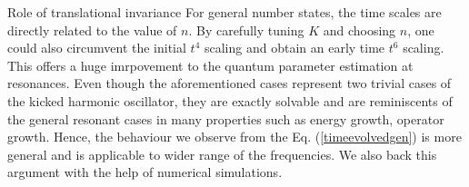 \documentclass[amsmath,nobibnotes,aps,amssymb,pra, prl,aps,showpacs,superscriptaddress,twocolumn, longbibliography, reprint]{revtex4-2}
\begin{document}
\begin{section}{Role of translational invariance}
For general number states, the time scales are directly related to the value of $n$. By carefully tuning $K$ and choosing $n$, one could also circumvent the initial $t^4$ scaling and obtain an early time $t^6$ scaling. This offers a huge imrpovement to the quantum parameter estimation at resonances. Even though the aforementioned cases represent two trivial cases of the kicked harmonic oscillator, they are exactly solvable and are reminiscents of the general resonant cases in many properties such as energy growth, operator growth. Hence, the behaviour we observe from the Eq. (\ref{timeevolvedgen}) is more general and is applicable to wider range of the frequencies. We also back this argument with the help of numerical simulations.
\fi





\end{section}
\end{document}
